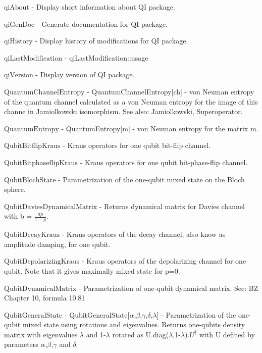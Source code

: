 \documentclass[a4paper,12pt]{article}
\begin{document}
\textbf{$ \text{qiAbout} $ } - Display short information about QI package.$  $

\textbf{$ \text{qiGenDoc} $ } - Generate documentation for QI package.$  $

\textbf{$ \text{qiHistory} $ } - Display history of modifications for QI package.$  $

\textbf{$ \text{qiLastModification} $ } - qiLastModification$ \text{::} $usage$  $

\textbf{$ \text{qiVersion} $ } - Display version of QI package.$  $

\textbf{$ \text{QuantumChannelEntropy} $ } - QuantumChannelEntropy[ch] - von Neuman entropy of the quantum channel calculated as a von Neuman entropy for the image of this channe in Jamiolkowski isomorphism. See also: Jamiolkowski, Superoperator.$  $

\textbf{$ \text{QuantumEntropy} $ } - QuantumEntropy[m] - von Neuman entropy for the matrix m.$  $

\textbf{$ \text{QubitBitflipKraus} $ } - Kraus operators for one qubit bit-flip channel.$  $

\textbf{$ \text{QubitBitphaseflipKraus} $ } - Kraus operators for one qubit bit-phase-flip channel.$  $

\textbf{$ \text{QubitBlochState} $ } - Parametrization of the one-qubit mixed state on the Bloch sphere.$  $

\textbf{$ \text{QubitDaviesDynamicalMatrix} $ } - Returns dynamical matrix for Davies channel with b = $ \frac{a p}{1-p}. $

\textbf{$ \text{QubitDecayKraus} $ } - Kraus operators of the decay channel, also know as amplitude damping, for one qubit.$  $

\textbf{$ \text{QubitDepolarizingKraus} $ } - Kraus operators of the depolarizing channel for one qubit. Note that it gives maximally mixed state for p=0.$  $

\textbf{$ \text{QubitDynamicalMatrix} $ } - Parametrization of one-qubit dynamical matrix. See: BZ Chapter 10, formula 10.81$  $

\textbf{$ \text{QubitGeneralState} $ } - QubitGeneralState[$\alpha $,$\beta $,$\gamma $,$\delta $,$\lambda $] - Parametrization of the one-qubit mixed state using rotations and eigenvalues. Returns one-qubits density matrix with eigenvalues $\lambda $ and 1-$\lambda $ rotated as U.diag($\lambda $,1-$\lambda $).$ U^{\dagger } $ with U defined by parameters $\alpha $,$\beta $,$\gamma $ and $\delta $.$  $
\end{document}
